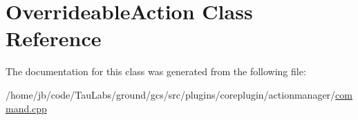 \hypertarget{class_overrideable_action}{\section{\-Overrideable\-Action \-Class \-Reference}
\label{class_overrideable_action}
}


\-The documentation for this class was generated from the following file\-:\begin{DoxyCompactItemize}
\item 
/home/jb/code/\-Tau\-Labs/ground/gcs/src/plugins/coreplugin/actionmanager/\hyperlink{command_8cpp}{command.\-cpp}\end{DoxyCompactItemize}
